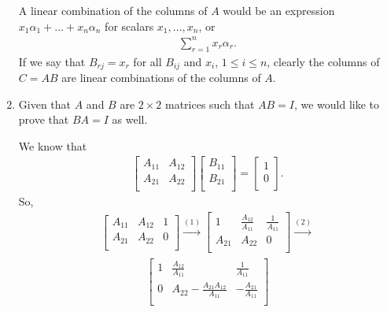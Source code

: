 \documentclass[12pt]{article}
\begin{document}
\begin{enumerate}
    A linear combination of the columns of $A$ would be an
    expression $x_1\alpha_1 + \ldots + x_n\alpha_n$ for scalars
    $x_1,\ldots,x_n$, or
    \begin{align*}
      \sum_{r = 1}^{n} x_r\alpha_r.
    \end{align*}
    If we say that $B_{rj} = x_r$ for all $B_{ij}$ and $x_i$, $1
    \leq i \leq n$, clearly the columns of $C = AB$ are linear
    combinations of the columns of $A$.

  \item
    Given that $A$ and $B$ are $2 \times 2$ matrices such that
    $AB = I$, we would like to prove that $BA = I$ as well.

    We know that
    \begin{align*}
      \begin{bmatrix}
        A_{11} & A_{12}\\
        A_{21} & A_{22}\\
      \end{bmatrix}
      \begin{bmatrix}
        B_{11}\\
        B_{21}\\
      \end{bmatrix}
      =
      \begin{bmatrix}
        1\\
        0\\
      \end{bmatrix}.
    \end{align*}
    So,
    \begin{align*}
      \begin{bmatrix}
        A_{11} & A_{12} & 1\\
        A_{21} & A_{22} & 0\\
      \end{bmatrix}
      \xrightarrow{(1)}
      \begin{bmatrix}
        1 & \frac{A_{12}}{A_{11}} & \frac{1}{A_{11}}\\
        A_{21} & A_{22} & 0\\
      \end{bmatrix}
      \xrightarrow{(2)}
    \end{align*}
    \begin{align*}
      \begin{bmatrix}
        1 & \frac{A_{12}}{A_{11}} & \frac{1}{A_{11}}\\
        0 & A_{22} - \frac{A_{21}A_{12}}{A_{11}} & -\frac{A_{21}}{A_{11}}\\

\end{bmatrix}
\end{align*}
\end{enumerate}
\end{document}
